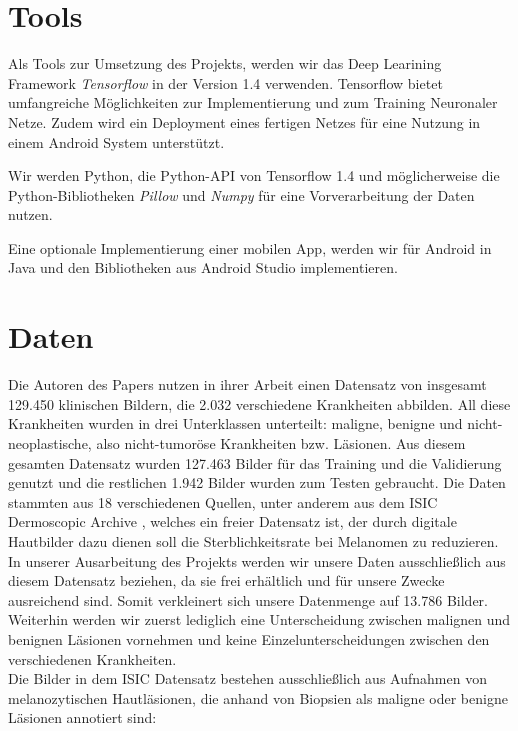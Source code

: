 \documentclass[%
   10pt,              %
   a4paper,           %
   DIV10,             %
]{scrartcl}%
\begin{document}
\section*{Tools}
Als Tools zur Umsetzung des Projekts, werden wir das Deep Learining Framework \textit{Tensorflow} \cite{tensorflow2015-whitepaper} in der Version 1.4 verwenden. Tensorflow bietet umfangreiche Möglichkeiten zur Implementierung und zum Training Neuronaler Netze. Zudem wird ein Deployment eines fertigen Netzes für eine Nutzung in einem Android System unterstützt.

Wir werden Python, die Python-API von Tensorflow 1.4 und möglicherweise die Python-Bibliotheken \textit{Pillow} und \textit{Numpy} für eine Vorverarbeitung der Daten nutzen.

Eine optionale Implementierung einer mobilen App, werden wir für Android in Java und den Bibliotheken aus Android Studio implementieren. 

\section*{Daten}

Die Autoren des Papers nutzen in ihrer Arbeit einen Datensatz von insgesamt 129.450 klinischen Bildern, die 2.032 verschiedene Krankheiten abbilden. All diese Krankheiten wurden in drei Unterklassen unterteilt: maligne, benigne und nicht-neoplastische, also nicht-tumoröse Krankheiten bzw. Läsionen. Aus diesem gesamten Datensatz wurden 127.463 Bilder für das Training und die Validierung genutzt und die restlichen 1.942 Bilder wurden zum Testen gebraucht. Die Daten stammten aus 18 verschiedenen Quellen, unter anderem aus dem ISIC Dermoscopic Archive \cite{ISIC}, welches ein freier Datensatz ist, der durch digitale Hautbilder dazu dienen soll die Sterblichkeitsrate bei Melanomen zu reduzieren. In unserer Ausarbeitung des Projekts werden wir unsere Daten ausschließlich aus diesem Datensatz beziehen, da sie frei erhältlich und für unsere Zwecke ausreichend sind. Somit verkleinert sich unsere Datenmenge auf 13.786 Bilder. Weiterhin werden wir zuerst lediglich eine Unterscheidung zwischen malignen und benignen Läsionen vornehmen und keine Einzelunterscheidungen zwischen den verschiedenen Krankheiten.\\
\noindent Die Bilder in dem ISIC Datensatz bestehen ausschließlich aus Aufnahmen von melanozytischen Hautläsionen, die anhand von Biopsien als maligne oder benigne Läsionen annotiert sind: 
\end{document}
